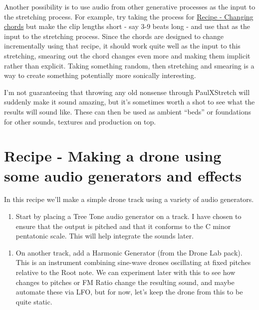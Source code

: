 \documentclass[
  12pt,
  letterpaper,
  oneside,
  open=any]{scrbook}
\makeatletter
\providecommand{\tightlist}{%
  \setlength{\itemsep}{0pt}\setlength{\parskip}{0pt}}\usepackage{longtable,booktabs,array}
\newcommand*\pandocbounded[1]{%
  \sbox\pandoc@box{#1}%
  \Gscale@div\@tempa{\textheight}{\dimexpr\ht\pandoc@box+\dp\pandoc@box\relax}%
  \Gscale@div\@tempb{\linewidth}{\wd\pandoc@box}%
  \ifdim\@tempb\p@<\@tempa\p@\let\@tempa\@tempb\fi%
  \ifdim\@tempa\p@<\p@\scalebox{\@tempa}{\usebox\pandoc@box}%
  \else\usebox{\pandoc@box}%
  \fi%
}
\makeatother
\begin{document}
Another possibility is to use audio from other generative processes as
the input to the stretching process. For example, try taking the process
for \hyperref[Chapter-001-Recipe-Changing_Chords]{Recipe - Changing
chords} but make the clip lengths short - say 3-9 beats long - and use
that as the input to the stretching process. Since the chords are
designed to change incrementally using that recipe, it should work quite
well as the input to this stretching, smearing out the chord changes
even more and making them implicit rather than explicit. Taking
something random, then stretching and smearing is a way to create
something potentially more sonically interesting.

I'm not guaranteeing that throwing any old nonsense through PaulXStretch
will suddenly make it sound amazing, but it's sometimes worth a shot to
see what the results will sound like. These can then be used as ambient
``beds'' or foundations for other sounds, textures and production on
top.


\chapter{Recipe - Making a drone using some audio generators and
effects}\label{Chapter-017-Recipe-Audio_generators_drone}

In this recipe we'll make a simple drone track using a variety of audio
generators.

\begin{enumerate}
\def\labelenumi{\arabic{enumi}.}
\tightlist
\item
  Start by placing a Tree Tone audio generator on a track. I have chosen
  to ensure that the output is pitched and that it conforms to the C
  minor pentatonic scale. This will help integrate the sounds later.
\end{enumerate}

\pandocbounded{\texttt{[image: images/Recipe5\_TreeTone.png]}}

\begin{enumerate}
\def\labelenumi{\arabic{enumi}.}
\setcounter{enumi}{1}
\tightlist
\item
  On another track, add a Harmonic Generator (from the Drone Lab pack).
  This is an instrument combining sine-wave drones oscillating at fixed
  pitches relative to the Root note. We can experiment later with this
  to see how changes to pitches or FM Ratio change the resulting sound,
  and maybe automate these via LFO, but for now, let's keep the drone
  from this to be quite static.
\end{enumerate}
\end{document}
